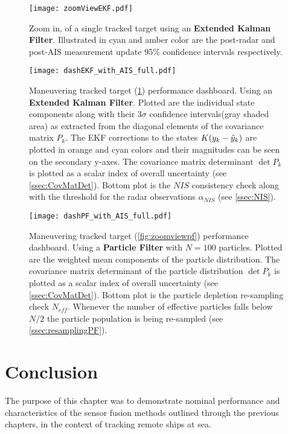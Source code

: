 \begin{figure}
	\centering
	\texttt{[image: zoomViewEKF.pdf]}
	\caption{Zoom in, of a single tracked target using an \textbf{Extended Kalman Filter}. Illustrated in cyan and amber color are the post-radar and post-AIS measurement update 95\% confidence intervals respectively. }
	\label{fig:zoomviewEKF}
\end{figure}



\begin{figure}
	\centering
	\texttt{[image: dashEKF\_with\_AIS\_full.pdf]}
	\caption{Maneuvering tracked target (\cref{fig:zoomviewEKF}) performance dashboard. Using an \textbf{Extended Kalman Filter}. Plotted are the individual state components along with their $3\sigma$ confidence intervals(gray shaded area) as extracted from the diagonal elements of the covariance matrix $P_k$. The EKF corrections to the states $K({{y}}_k - {\hat{{y}}}_k)$ are plotted in orange and cyan colors and their magnitudes can be seen on the secondary y-axes. The covariance matrix determinant $\det{P_k}$ is plotted as a scalar index of overall uncertainty (see \cref{ssec:CovMatDet}). Bottom plot is the $NIS$ consistency check along with the threshold for the radar observations $\alpha_{NIS}$ (see \cref{ssec:NIS}).}
	\label{fig:dashEKF_with_AIS_full}
\end{figure}

\begin{figure}
	\centering
	\texttt{[image: dashPF\_with\_AIS\_full.pdf]}
	\caption{Maneuvering tracked target (\cref{fig:zoomviewpf}) performance dashboard. Using a \textbf{Particle Filter} with $N=100$ particles. Plotted are the weighted mean components of the particle distribution. The covariance matrix determinant of the particle distribution $\det{P_k}$ is plotted as a scalar index of overall uncertainty (see \cref{ssec:CovMatDet}). Bottom plot is the particle depletion re-sampling check $N_{eff}$. Whenever the number of effective particles falls below $N/2$ the particle population is being re-sampled (see \cref{ssec:resamplingPF}).}
	\label{fig:dashPF_with_AIS_full}
\end{figure}

\section{Conclusion}

The purpose of this chapter was to demonstrate nominal performance and characteristics of the sensor fusion methods outlined through the previous chapters, in the context of tracking remote ships at sea. 

